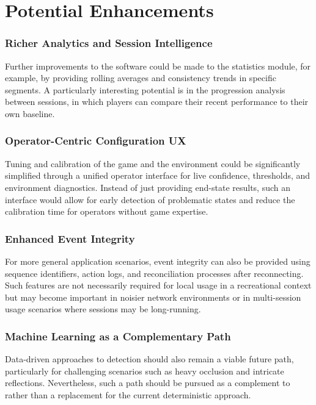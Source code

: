 \section{Potential Enhancements}

\subsubsection{Richer Analytics and Session Intelligence}
Further improvements to the software could be made to the statistics module, for example, by providing rolling averages and consistency trends in specific segments. A particularly interesting potential is in the progression analysis between sessions, in which players can compare their recent performance to their own baseline.

\subsubsection{Operator-Centric Configuration UX}
Tuning and calibration of the game and the environment could be significantly simplified through a unified operator interface for live confidence, thresholds, and environment diagnostics. Instead of just providing end-state results, such an interface would allow for early detection of problematic states and reduce the calibration time for operators without game expertise.

\subsubsection{Enhanced Event Integrity}
For more general application scenarios, event integrity can also be provided using sequence identifiers, action logs, and reconciliation processes after reconnecting. Such features are not necessarily required for local usage in a recreational context but may become important in noisier network environments or in multi-session usage scenarios where sessions may be long-running.

\subsubsection{Machine Learning as a Complementary Path}
Data-driven approaches to detection should also remain a viable future path, particularly for challenging scenarios such as heavy occlusion and intricate reflections. Nevertheless, such a path should be pursued as a complement to rather than a replacement for the current deterministic approach.

